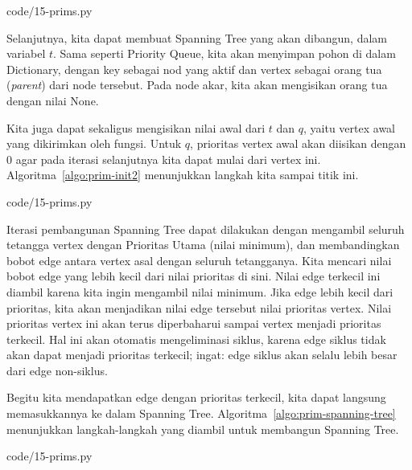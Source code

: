 
                {code/15-prims.py}

Selanjutnya, kita dapat membuat Spanning Tree yang akan dibangun, dalam variabel $t$. Sama seperti Priority Queue, kita akan menyimpan pohon di dalam Dictionary, dengan key sebagai nod yang aktif dan vertex sebagai orang tua (\textit{parent}) dari node tersebut. Pada node akar, kita akan mengisikan orang tua dengan nilai None.

Kita juga dapat sekaligus mengisikan nilai awal dari $t$ dan $q$, yaitu vertex awal yang dikirimkan oleh fungsi. Untuk $q$, prioritas vertex awal akan diisikan dengan $0$ agar pada iterasi selanjutnya kita dapat mulai dari vertex ini. Algoritma~\ref{algo:prim-init2} menunjukkan langkah kita sampai titik ini.


                {code/15-prims.py}

Iterasi pembangunan Spanning Tree dapat dilakukan dengan mengambil seluruh tetangga vertex dengan Prioritas Utama (nilai minimum), dan membandingkan bobot edge antara vertex asal dengan seluruh tetangganya. Kita mencari nilai bobot edge yang lebih kecil dari nilai prioritas di sini. Nilai edge terkecil ini diambil karena kita ingin mengambil nilai minimum. Jika edge lebih kecil dari prioritas, kita akan menjadikan nilai edge tersebut nilai prioritas vertex. Nilai prioritas vertex ini akan terus diperbaharui sampai vertex menjadi prioritas terkecil. Hal ini akan otomatis mengeliminasi siklus, karena edge siklus tidak akan dapat menjadi prioritas terkecil; ingat: edge siklus akan selalu lebih besar dari edge non-siklus.

Begitu kita mendapatkan edge dengan prioritas terkecil, kita dapat langsung memasukkannya ke dalam Spanning Tree. Algoritma~\ref{algo:prim-spanning-tree} menunjukkan langkah-langkah yang diambil untuk membangun Spanning Tree.


                {code/15-prims.py}

